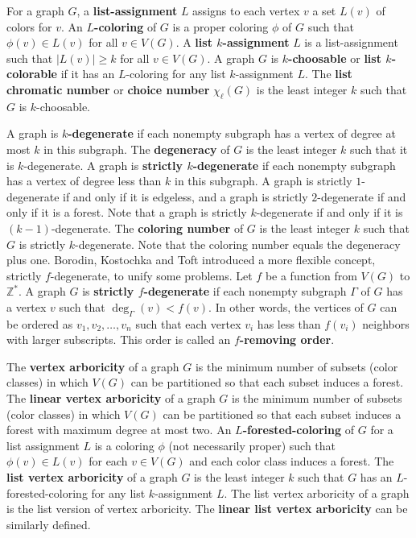 \documentclass{article}
\theoremstyle{definition}
\begin{document}
For a graph $G$, a \textbf{list-assignment} $L$ assigns to each vertex $v$ a set $L(v)$ of colors for $v$. An \textbf{$L$-coloring} of $G$ is a proper coloring $\phi$ of $G$ such that $\phi(v) \in L(v)$ for all $v \in V(G)$. A \textbf{list $k$-assignment} $L$ is a list-assignment such that $|L(v)| \geq k$ for all $v \in V(G)$. A graph $G$ is \textbf{$k$-choosable} or \textbf{list $k$-colorable} if it has an $L$-coloring for any list $k$-assignment $L$. The \textbf{list chromatic number} or \textbf{choice number} $\chi_{\ell}(G)$ is the least integer $k$ such that $G$ is $k$-choosable. 

A graph is \textbf{$k$-degenerate} if each nonempty subgraph has a vertex of degree at most $k$ in this subgraph. The \textbf{degeneracy} of $G$ is the least integer $k$ such that it is $k$-degenerate. A graph is \textbf{strictly $k$-degenerate} if each nonempty subgraph has a vertex of degree less than $k$ in this subgraph. A graph is strictly $1$-degenerate if and only if it is edgeless, and a graph is strictly $2$-degenerate if and only if it is a forest. Note that a graph is strictly $k$-degenerate if and only if it is $(k-1)$-degenerate. The \textbf{coloring number} of $G$ is the least integer $k$ such that $G$ is strictly $k$-degenerate. Note that the coloring number equals the degeneracy plus one. Borodin, Kostochka and Toft \cite{MR1743629} introduced a more flexible concept, strictly $f$-degenerate, to unify some problems. Let $f$ be a function from $V(G)$ to $\mathbb{Z}^{*}$. A graph $G$ is \textbf{strictly $f$-degenerate} if each nonempty subgraph $\Gamma$ of $G$ has a vertex $v$ such that $\deg_{\Gamma}(v) < f(v)$. In other words, the vertices of $G$ can be ordered as $v_{1}, v_{2}, \dots, v_{n}$ such that each vertex $v_{i}$ has less than $f(v_{i})$ neighbors with larger subscripts. This order is called an \textbf{$f$-removing order}. 

The \textbf{vertex arboricity} of a graph $G$ is the minimum number of subsets (color classes) in which $V(G)$ can be partitioned so that each subset induces a forest. The \textbf{linear vertex arboricity} of a graph $G$ is the minimum number of subsets (color classes) in which $V(G)$ can be partitioned so that each subset induces a forest with maximum degree at most two. An \textbf{$L$-forested-coloring} of $G$ for a list assignment $L$ is a coloring $\phi$ (not necessarily proper) such that $\phi(v) \in L(v)$ for each $v \in V(G)$ and each color class induces a forest. The \textbf{list vertex arboricity} of a graph $G$ is the least integer $k$ such that $G$ has an $L$-forested-coloring for any list $k$-assignment $L$. The list vertex arboricity of a graph is the list version of vertex arboricity. The \textbf{linear list vertex arboricity} can be similarly defined. 
\end{document}
